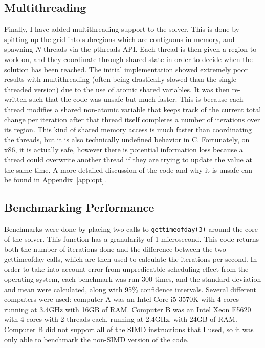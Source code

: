 \subsection{Multithreading}
Finally, I have added multithreading support to the solver. This is done by spitting up the grid into subregions which
are contiguous in memory, and spawning $N$ threads via the pthreads API. Each thread is then given a region to work on,
and they coordinate through shared state in order to decide when the solution has been reached. The initial implementation
showed extremely poor results with multithreading (often being drastically slowed than the single threaded version)
due to the use of atomic shared variables. It was then re-written such that the code was unsafe but much faster. This
is because each thread modifies a shared non-atomic variable that keeps track of the current total change per iteration
after that thread itself completes a number of iterations over its region. This kind of shared memory access is much faster
than coordinating the threads, but it is also technically undefined behavior in C. Fortunately, on x86, it is actually
safe, however there is potential information loss because a thread could overwrite another thread if they are trying to
update the value at the same time. A more detailed discussion of the code and why it is unsafe can be found in Appendix~\ref{app:opt}.

\subsection{Benchmarking Performance}
Benchmarks were done by placing two calls to \texttt{gettimeofday(3)} around the core of the solver. This function has a
granularity of 1 microsecond\cite{gtod}. This code returns
both the number of iterations done and the difference between the two gettimeofday calls, which are then used to calculate
the iterations per second. In order to take into account error from unpredicatble scheduling effect from the operating system,
each benchmark was run 300 times, and the standard deviation and mean were calculated, along with 95\% confidence intervals. Several different computers were used:
computer A was an Intel Core i5-3570K with 4 cores running at 3.4GHz with 16GB of RAM. Computer B was an Intel Xeon E5620
with 4 cores with 2 threads each, running at 2.4GHz, with 24GB of RAM. Computer B did not support all of the SIMD instructions
that I used, so it was only able to benchmark the non-SIMD version of the code.

